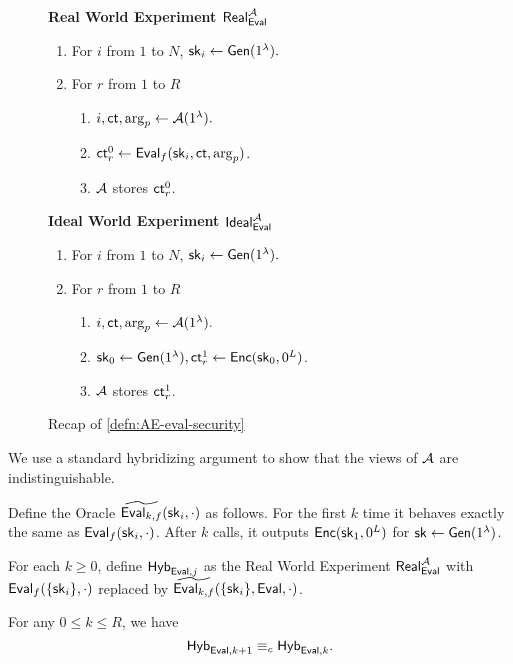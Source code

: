 \begin{figure}[ht!]
\begin{framed}
\textbf{Real World Experiment $\mathsf{Real}^{\mathcal{A}}_{\mathsf{Eval}}$}
\begin{enumerate}
    \item For $i$ from $1$ to $N$, ${\mathsf{sk}}_i \leftarrow \mathsf{Gen}(1^{\lambda}).$
    \item For $r$ from $1$ to $R$
    \begin{enumerate}
        \item $i, \mathsf{ct}, \arg_p \leftarrow \mathcal{A}(1^{\lambda}).$
        \item $\mathsf{ct}^{0}_r \leftarrow \mathsf{Eval}_f({\mathsf{sk}}_i, \mathsf{ct}, \arg_p)$.
        \item $\mathcal{A}$ stores $\mathsf{ct}^{0}_r$.
    \end{enumerate}
\end{enumerate}
\textbf{Ideal World Experiment $\mathsf{Ideal}^{\mathcal{A}}_{\mathsf{Eval}}$}
\begin{enumerate}
    \item For $i$ from $1$ to $N$, ${\mathsf{sk}}_i \leftarrow \mathsf{Gen}(1^{\lambda}).$
    \item For $r$ from $1$ to $R$
    \begin{enumerate}
        \item $i, \mathsf{ct}, \arg_p \leftarrow \mathcal{A}(1^{\lambda}).$
        \item ${\mathsf{sk}}_0 \leftarrow \mathsf{Gen}(1^{\lambda}), \mathsf{ct}^{1}_r \leftarrow \mathsf{Enc}({\mathsf{sk}}_0, 0^L)$.
        \item $\mathcal{A}$ stores $\mathsf{ct}^{1}_r$.
    \end{enumerate}
\end{enumerate}
\end{framed}
\caption{Recap of \cref{defn:AE-eval-security}}
\end{figure}
We use a standard hybridizing argument to show that the views of $\mathcal{A}$ are indistinguishable. 
\begin{definition}
Define the Oracle $\widetilde{\mathsf{Eval}_{k, f}}({\mathsf{sk}}_i, \cdot)$ as follows. For the first $k$ time it behaves exactly the same as $\mathsf{Eval}_f({\mathsf{sk}}_i, \cdot)$. After $k$ calls, it outputs $\mathsf{Enc}({\mathsf{sk}}_1, 0^L)$ for ${\mathsf{sk}} \leftarrow \mathsf{Gen}(1^{\lambda})$.

For each $k \geq 0$, define $\mathsf{Hyb}_{\mathsf{Eval}, j}$ as the Real World Experiment $\mathsf{Real}_{\mathsf{Eval}}^{\mathcal{A}}$ with $\mathsf{Eval}_f(\{{\mathsf{sk}}_i\}, \cdot)$ replaced by $\widetilde{\mathsf{Eval}_{k, f}}(\{{\mathsf{sk}}_i\}, \mathsf{Eval}, \cdot)$. 
\end{definition}
\begin{lemma}
    For any $0 \leq k \leq R$, we have 
    $$\mathsf{Hyb}_{\mathsf{Eval}, k + 1} \equiv_c \mathsf{Hyb}_{\mathsf{Eval}, k}.$$
\end{lemma}
